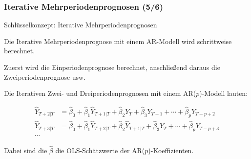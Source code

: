 \documentclass[10pt,aspectratio=169]{beamer}\usepackage[]{graphicx}\usepackage[]{xcolor}
\begin{document}
\begin{frame}
  \frametitle{Iterative Mehrperiodenprognosen \hfill (5/6)}


  \begin{alertblock}{Schlüsselkonzept: Iterative Mehrperiodenprognosen}

  Die Iterative Mehrperiodenprognose mit einem AR-Modell wird schrittweise berechnet.
  
  Zuerst wird die Einperiodenprognose berechnet, anschließend daraus die Zweiperiodenprognose usw.
  
  Die Iterativen Zwei- und Dreiperiodenprognosen mit einem AR($p$)-Modell lauten:
  
  \vspace{-0.25cm}
  
  \begin{align*}
  \widehat{Y}_{T+2|T} &= \widehat{\beta}_0 + \widehat{\beta}_1 \widehat{Y}_{T+1|T} + \widehat{\beta}_2 Y_T + \widehat{\beta}_3 Y_{T-1} + \cdots + \widehat{\beta}_p Y_{T-p+2} \\
  \widehat{Y}_{T+3|T} &= \widehat{\beta}_0 + \widehat{\beta}_1 \widehat{Y}_{T+2|T} + \widehat{\beta}_2 \widehat{Y}_{T+1|T} + \widehat{\beta}_3 Y_T + \cdots + \widehat{\beta}_p Y_{T-p+3} \\
  \cdots
  \end{align*}
  
  \vspace{-0.25cm}
  
  Dabei sind die $\widehat{\beta}$ die OLS-Schätzwerte der AR($p$)-Koeffizienten.
  
	\end{alertblock}
  
\end{frame}
\end{document}
